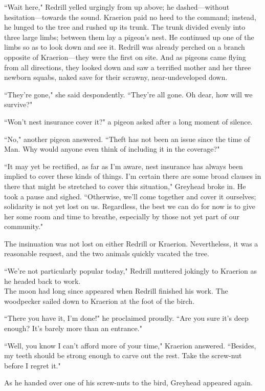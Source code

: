 ``Wait here," Redrill yelled urgingly from up above; he dashed---without hesitation---towards the sound.
Kraerion paid no heed to the command; instead, he lunged to the tree and rushed up its trunk.
The trunk divided evenly into three large limbs; between them lay a pigeon's nest.
He continued up one of the limbs so as to look down and see it.
Redrill was already perched on a branch opposite of Kraerion---they were the first on site.
And as pigeons came flying from all directions, they looked down and saw a terrified mother and her three newborn squabs, naked save for their scrawny, near-undeveloped down.

``They're gone," she said despondently.
``They're all gone.
Oh dear, how will we survive?"

``Won't nest insurance cover it?" a pigeon asked after a long moment of silence.

``No," another pigeon answered.
``Theft has not been an issue since the time of Man.
Why would anyone even think of including it in the coverage?"

``It may yet be rectified, as far as I'm aware, nest insurance has always been implied to cover these kinds of things.
I'm certain there are some broad clauses in there that might be stretched to cover this situation," Greyhead broke in.
He took a pause and sighed.
``Otherwise, we'll come together and cover it ourselves; solidarity is not yet lost on us.
Regardless, the best we can do for now is to give her some room and time to breathe, especially by those not yet part of our community."

The insinuation was not lost on either Redrill or Kraerion.
Nevertheless, it was a reasonable request, and the two animals quickly vacated the tree.

``We're not particularly popular today," Redrill muttered jokingly to Kraerion as he headed back to work. \\

The moon had long since appeared when Redrill finished his work.
The woodpecker sailed down to Kraerion at the foot of the birch.

``There you have it, I'm done!" he proclaimed proudly.
``Are you sure it's deep enough?
It's barely more than an entrance."

``Well, you know I can't afford more of your time," Kraerion answered.
``Besides, my teeth should be strong enough to carve out the rest.
Take the screw-nut before I regret it."

As he handed over one of his screw-nuts to the bird, Greyhead appeared again.

